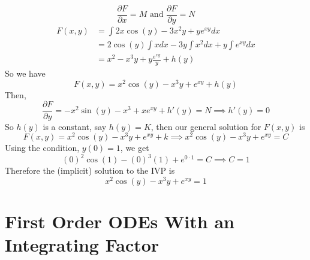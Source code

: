 \documentclass[openany]{report}
\begin{document}
\[\frac{\partial F}{\partial x} = M \text{ and } \frac{\partial F}{\partial y} = N\]
\begin{align*}
    F(x,y) &= \int 2x\cos(y) - 3x^2y + ye^{xy}dx\\
    &= 2\cos(y)\int xdx - 3y \int x^2dx + y\int e^{xy}dx\\
    &=x^2 - x^3y + y\frac{e^{xy}}{y} + h(y)
\end{align*}
So we have
\[F(x,y) = x^2\cos(y) - x^3y + e^{xy} + h(y)\]
Then, 
\[\frac{\partial F}{\partial y} = -x^2\sin(y) - x^3 + xe^{xy} + h'(y) = N \implies h'(y) = 0\]
So $h(y)$ is a constant, say $h(y) = K$, then our general solution for $F(x,y)$ is 
\[F(x,y) = x^2\cos(y) - x^3y + e^{xy} + k \implies x^2\cos(y) - x^3y + e^{xy} = C\]
Using the condition, $y(0) = 1$, we get
\[(0)^2\cos(1) - (0)^3(1) + e^{0\cdot 1} = C \implies C = 1 \]
Therefore the (implicit) solution to the IVP is
\[x^2\cos(y) - x^3y + e^{xy} = 1\]
\section{First Order ODEs With an Integrating Factor}
\end{document}
